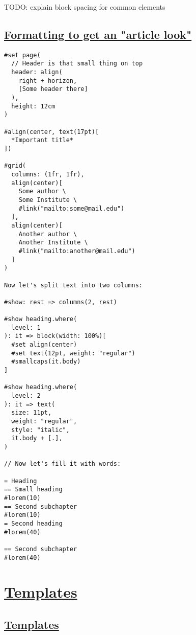 TODO: explain block spacing for common elements

\subsection{\texorpdfstring{\hyperref[formatting-to-get-an-article-look]{Formatting
to get an "article
look"}}{Formatting to get an "article look"}}\label{formatting-to-get-an-article-look}

\begin{verbatim}
#set page(
  // Header is that small thing on top
  header: align(
    right + horizon,
    [Some header there]
  ),
  height: 12cm
)

#align(center, text(17pt)[
  *Important title*
])

#grid(
  columns: (1fr, 1fr),
  align(center)[
    Some author \
    Some Institute \
    #link("mailto:some@mail.edu")
  ],
  align(center)[
    Another author \
    Another Institute \
    #link("mailto:another@mail.edu")
  ]
)

Now let's split text into two columns:

#show: rest => columns(2, rest)

#show heading.where(
  level: 1
): it => block(width: 100%)[
  #set align(center)
  #set text(12pt, weight: "regular")
  #smallcaps(it.body)
]

#show heading.where(
  level: 2
): it => text(
  size: 11pt,
  weight: "regular",
  style: "italic",
  it.body + [.],
)

// Now let's fill it with words:

= Heading
== Small heading
#lorem(10)
== Second subchapter
#lorem(10)
= Second heading
#lorem(40)

== Second subchapter
#lorem(40)
\end{verbatim}

\pandocbounded{}

\section{\texorpdfstring{\hyperref[templates]{Templates}}{Templates}}\label{templates}

\subsection{\texorpdfstring{\hyperref[templates-1]{Templates}}{Templates}}\label{templates-1}


